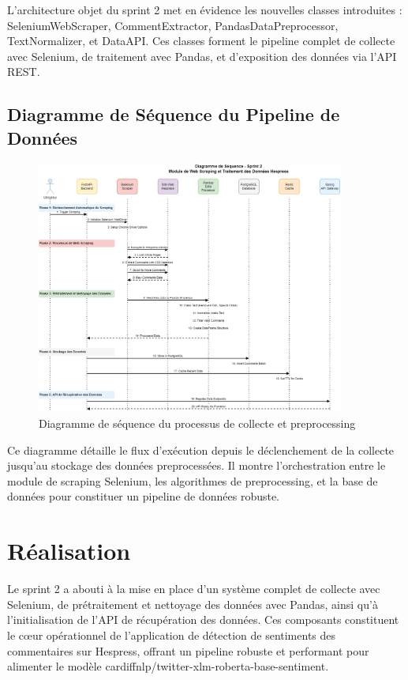 L'architecture objet du sprint 2 met en évidence les nouvelles classes introduites : SeleniumWebScraper, CommentExtractor, PandasDataPreprocessor, TextNormalizer, et DataAPI. Ces classes forment le pipeline complet de collecte avec Selenium, de traitement avec Pandas, et d'exposition des données via l'API REST.

\subsection{Diagramme de Séquence du Pipeline de Données}

\begin{figure}[H]
\centering
\includegraphics[width=0.9\textwidth]{assets/images/sprint2-sequence.png}
\caption{Diagramme de séquence du processus de collecte et preprocessing}
\label{fig:data-pipeline-sequence}
\end{figure}

Ce diagramme détaille le flux d'exécution depuis le déclenchement de la collecte jusqu'au stockage des données preprocessées. Il montre l'orchestration entre le module de scraping Selenium, les algorithmes de preprocessing, et la base de données pour constituer un pipeline de données robuste.



\section{Réalisation}

Le sprint 2 a abouti à la mise en place d'un système complet de collecte avec Selenium, de prétraitement et nettoyage des données avec Pandas, ainsi qu'à l'initialisation de l'API de récupération des données. Ces composants constituent le cœur opérationnel de l'application de détection de sentiments des commentaires sur Hespress, offrant un pipeline robuste et performant pour alimenter le modèle cardiffnlp/twitter-xlm-roberta-base-sentiment.

